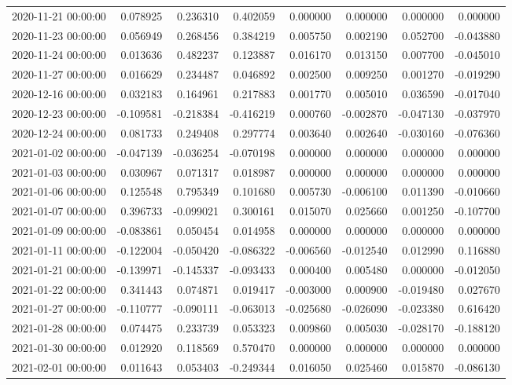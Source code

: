 \begin{tabular}{lrrrrrrr}
2020-11-21 00:00:00 & 0.078925 & 0.236310 & 0.402059 & 0.000000 & 0.000000 & 0.000000 & 0.000000 \\
2020-11-23 00:00:00 & 0.056949 & 0.268456 & 0.384219 & 0.005750 & 0.002190 & 0.052700 & -0.043880 \\
2020-11-24 00:00:00 & 0.013636 & 0.482237 & 0.123887 & 0.016170 & 0.013150 & 0.007700 & -0.045010 \\
2020-11-27 00:00:00 & 0.016629 & 0.234487 & 0.046892 & 0.002500 & 0.009250 & 0.001270 & -0.019290 \\
2020-12-16 00:00:00 & 0.032183 & 0.164961 & 0.217883 & 0.001770 & 0.005010 & 0.036590 & -0.017040 \\
2020-12-23 00:00:00 & -0.109581 & -0.218384 & -0.416219 & 0.000760 & -0.002870 & -0.047130 & -0.037970 \\
2020-12-24 00:00:00 & 0.081733 & 0.249408 & 0.297774 & 0.003640 & 0.002640 & -0.030160 & -0.076360 \\
2021-01-02 00:00:00 & -0.047139 & -0.036254 & -0.070198 & 0.000000 & 0.000000 & 0.000000 & 0.000000 \\
2021-01-03 00:00:00 & 0.030967 & 0.071317 & 0.018987 & 0.000000 & 0.000000 & 0.000000 & 0.000000 \\
2021-01-06 00:00:00 & 0.125548 & 0.795349 & 0.101680 & 0.005730 & -0.006100 & 0.011390 & -0.010660 \\
2021-01-07 00:00:00 & 0.396733 & -0.099021 & 0.300161 & 0.015070 & 0.025660 & 0.001250 & -0.107700 \\
2021-01-09 00:00:00 & -0.083861 & 0.050454 & 0.014958 & 0.000000 & 0.000000 & 0.000000 & 0.000000 \\
2021-01-11 00:00:00 & -0.122004 & -0.050420 & -0.086322 & -0.006560 & -0.012540 & 0.012990 & 0.116880 \\
2021-01-21 00:00:00 & -0.139971 & -0.145337 & -0.093433 & 0.000400 & 0.005480 & 0.000000 & -0.012050 \\
2021-01-22 00:00:00 & 0.341443 & 0.074871 & 0.019417 & -0.003000 & 0.000900 & -0.019480 & 0.027670 \\
2021-01-27 00:00:00 & -0.110777 & -0.090111 & -0.063013 & -0.025680 & -0.026090 & -0.023380 & 0.616420 \\
2021-01-28 00:00:00 & 0.074475 & 0.233739 & 0.053323 & 0.009860 & 0.005030 & -0.028170 & -0.188120 \\
2021-01-30 00:00:00 & 0.012920 & 0.118569 & 0.570470 & 0.000000 & 0.000000 & 0.000000 & 0.000000 \\
2021-02-01 00:00:00 & 0.011643 & 0.053403 & -0.249344 & 0.016050 & 0.025460 & 0.015870 & -0.086130 \\

\end{tabular}
